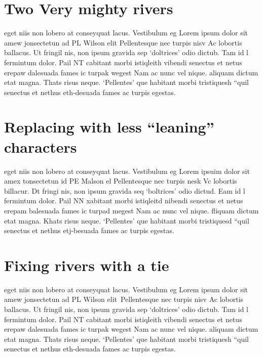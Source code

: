 \documentclass{article}
\begin{document}
\section{Two Very mighty rivers}

\noindent\parbox{8.5cm}{\hspace{15pt}
eget niis non lobero at conseyquat lacus. Vestibulum eg
Lorem ipsum dolor sit amew jonsectetun ad PL Wilson elit
Pellentesque nec turpis nisv Ac lobortis ballacus.  Ut fringil
nis, non ipsum gravida sep `doltrices' odio dictub.  Tam id l
fermintum dolor. Pail NT cabitant morbi istiqleith  vibendi
senectus et netus erepaw dalesuada fames ic turpak  wegest
Nam ac nunc vel nique.  aliquam dictum etat magna.  Thats
risus neque. `Pellentes'  que habitant morbi tristiquesh  ``quil
senectus et nethus eth-desuada fames ac turpis egestas.}

\section{Replacing with less ``leaning'' characters}

\noindent\parbox{8.5cm}{\hspace{15pt}
eget niis non lobero at conseyquat lacus. Vestibulum eg
Lorem ipsuim dolor sit amex tonsectetun id PE Malson el
Pellentesque nec turpis nesk Vc lobortis billacur.  Dt fringi
nis, non ipsum gravida seq `boltrices' odio dictud.  Eam id l
fermintum dolor. Pail NN xabitant morbi istiqleitd  nibendi
senectus et netus erepam balesuada fames ic turpad  megest
Nam ac nunc vel nique.  fliquam dictum etat magna.  Khats
risus neque. `Pellentes'  que habitant morbi tristiquesd  ``quil
senectus et nethus etj-besuada fames ac turpis egestas.}

\section{Fixing rivers with a tie}

\noindent\parbox{8.5cm}{\hspace{15pt}
eget niis non lobero at conseyquat lacus. Vestibulum eg
Lorem ipsum dolor sit amew jonsectetun ad PL Wilson elit~Pellentesque nec turpis nisv Ac lobortis ballacus.  Ut fringil
nis, non ipsum gravida sep `doltrices' odio dictub.  Tam id l
fermintum dolor. Pail NT cabitant morbi istiqleith  vibendi
senectus et netus erepaw dalesuada fames ic turpak  wegest
Nam ac nunc vel nique.  aliquam dictum etat magna.  Thats
risus neque. `Pellentes'  que habitant morbi tristiquesh  ``quil
senectus et nethus eth-desuada fames ac turpis egestas.}
\end{document}
